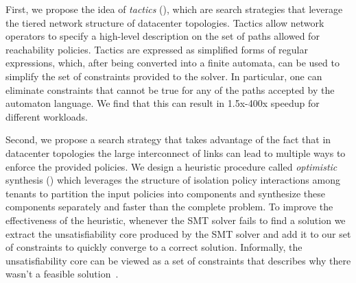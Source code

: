 First, we propose the idea of \emph{tactics} (),
which are search strategies that leverage the tiered network structure
of datacenter topologies.
Tactics allow network operators to specify a
high-level description on the set of paths allowed for reachability
policies.  Tactics are expressed as simplified forms of
regular expressions, which, after being converted into a finite
automata, can be used to simplify the set of constraints provided to
the solver.  In particular, one can eliminate constraints that cannot
be true for any of the paths accepted by the automaton language. We
find that this can result in 1.5x-400x speedup for different workloads.

Second, we propose a search strategy that takes advantage of the fact that in 
datacenter topologies the large
interconnect of links can lead to multiple ways 
to enforce the provided policies.  
We design a heuristic procedure called \emph{optimistic}
synthesis () which leverages the structure of
isolation policy interactions among tenants to partition the input
policies into components and synthesize these components separately and
faster than the complete problem. To improve the effectiveness of the
heuristic, whenever the SMT solver fails to find a solution we extract
the unsatisfiability core produced by the SMT solver and 
add it to our set of constraints to quickly converge to a correct solution.
Informally, the unsatisfiability core can be viewed
as a set of constraints that describes why there wasn't a feasible solution~\cite{unsatcores}.

